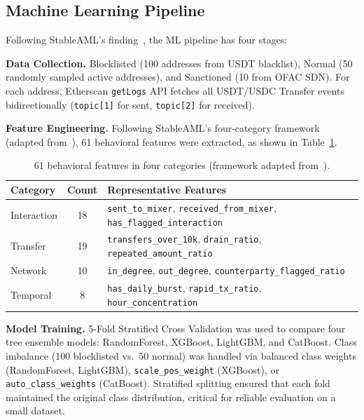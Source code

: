 \documentclass[12pt,a4paper]{article}
\begin{document}
\subsection{Machine Learning Pipeline}

Following StableAML's finding~\cite{juvinski2026}, the ML pipeline has four stages:

\textbf{Data Collection.} Blocklisted (100 addresses from USDT blacklist), Normal (50 randomly sampled active addresses), and Sanctioned (10 from OFAC SDN). For each address, Etherscan \texttt{getLogs} API fetches all USDT/USDC Transfer events bidirectionally (\texttt{topic[1]} for sent, \texttt{topic[2]} for received).

\textbf{Feature Engineering.} Following StableAML's four-category framework (adapted from~\cite{juvinski2026}), 61 behavioral features were extracted, as shown in Table~\ref{tab:features}.

\begin{table}[htbp]
\centering
\caption{61 behavioral features in four categories (framework adapted from~\cite{juvinski2026}).}
\label{tab:features}
\small
\begin{tabularx}{\textwidth}{l c X}
\toprule
\textbf{Category} & \textbf{Count} & \textbf{Representative Features} \\
\midrule
Interaction & 18 & \texttt{sent\_to\_mixer}, \texttt{received\_from\_mixer}, \texttt{has\_flagged\_interaction} \\
Transfer & 19 & \texttt{transfers\_over\_10k}, \texttt{drain\_ratio}, \texttt{repeated\_amount\_ratio} \\
Network & 10 & \texttt{in\_degree}, \texttt{out\_degree}, \texttt{counterparty\_flagged\_ratio} \\
Temporal & 8 & \texttt{has\_daily\_burst}, \texttt{rapid\_tx\_ratio}, \texttt{hour\_concentration} \\
\bottomrule
\end{tabularx}
\end{table}

\textbf{Model Training.} 5-Fold Stratified Cross Validation was used to compare four tree ensemble models: RandomForest, XGBoost, LightGBM, and CatBoost. Class imbalance (100 blocklisted vs.\ 50 normal) was handled via balanced class weights (RandomForest, LightGBM), \texttt{scale\_pos\_weight} (XGBoost), or \texttt{auto\_class\_weights} (CatBoost). Stratified splitting ensured that each fold maintained the original class distribution, critical for reliable evaluation on a small dataset.
\end{document}
